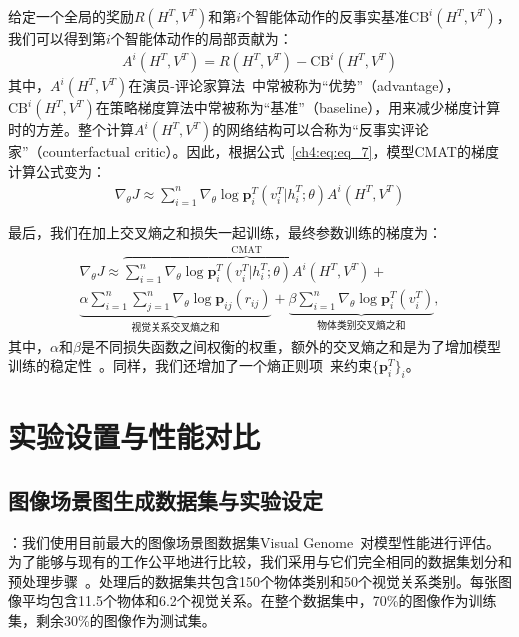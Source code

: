 给定一个全局的奖励$R(H^T, V^T)$和第$i$个智能体动作的反事实基准$\text{CB}^i(H^T, V^T)$，我们可以得到第$i$个智能体动作的局部贡献为：
\begin{align}
    A^i(H^T, V^T) = R(H^T, V^T) - \text{CB}^i(H^T, V^T)
\end{align}
其中，$A^i(H^T, V^T)$在演员-评论家算法~\cite{sutton2018reinforcement,mnih2016asynchronous}中常被称为“优势”（advantage），$\text{CB}^i(H^T, V^T)$在策略梯度算法中常被称为“基准”（baseline），用来减少梯度计算时的方差。整个计算$A^i(H^T, V^T)$的网络结构可以合称为“反事实评论家”（counterfactual critic）。因此，根据公式~\eqref{ch4:eq:eq_7}，模型CMAT的梯度计算公式变为：
\begin{align}
\nabla_{\theta} J \approx \sum^n_{i=1} \nabla_{\theta} \log \bm{p}^T_i (v^T_i|h^T_i; \theta) A^i(H^T, V^T)
\end{align}

最后，我们在加上交叉熵之和损失一起训练，最终参数训练的梯度为：
\begin{equation}
\begin{split}
\nabla_{\theta} J \approx  \overbrace{\sum^n_{i=1} \nabla_{\theta} \log \bm{p}^T_i (v^T_i|h^T_i; \theta) A^i(H^T, V^T)}^{\text{CMAT}} + \\
\underbrace{\alpha\sum^n_{i=1}\sum^n_{j=1} \nabla_{\theta} \log \bm{p}_{ij}(r_{ij})}_{\text{视觉关系交叉熵之和}} + 
\underbrace{\beta \sum^n_{i=1} \nabla_{\theta} \log \bm{p}^T_i(v^T_i)}_{\text{物体类别交叉熵之和}},
\end{split}
\end{equation}
其中，$\alpha$和$\beta$是不同损失函数之间权衡的权重，额外的交叉熵之和是为了增加模型训练的稳定性~\cite{rao2018learning}。同样，我们还增加了一个熵正则项~\cite{xu2015show, hu2017learning}来约束$\{\bm{p}^T_i\}_i$。


\section{实验设置与性能对比}
\subsection{图像场景图生成数据集与实验设定}

\textbf{}：我们使用目前最大的图像场景图数据集Visual Genome~\cite{krishna2017visual}对模型性能进行评估。为了能够与现有的工作公平地进行比较，我们采用与它们完全相同的数据集划分和预处理步骤~\cite{xu2017scene, zellers2018neural, newell2017pixels, yang2018graph, herzig2018mapping}。处理后的数据集共包含150个物体类别和50个视觉关系类别。每张图像平均包含11.5个物体和6.2个视觉关系。在整个数据集中，70\%的图像作为训练集，剩余30\%的图像作为测试集。


